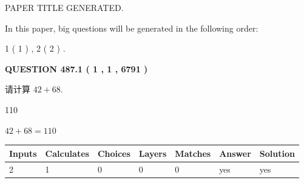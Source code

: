 \documentclass{ctexart}
\begin{document}
   
\vspace{0.2in}
   
   
   
   
   
   
   
   
 \vspace{0.2in}
 
 
 
 
   
   
 PAPER TITLE GENERATED.
   
   
   
\vspace{0.2in}
   
In this paper, big questions will be generated in the following order: 
   
   
   1 ( 1 )
 ,
   2 ( 2 )
 .
  
\vspace{0.2in}
  
{\textbf{\Large{QUESTION
487.1 
 ( 1 , 1 , 6791 )
}}}
  
  
 
请计算 $ %
42 +  %
68 $.
 
 
 
\noindent{}
 
 

110
 
 
\noindent{}
 
 

 
 
 
\noindent{}
 
 

$ %
42 +  %
68=   %
110$
 
 
\noindent{}
 
 

 
   
   
   
   
\noindent\begin{tabular}{|l|l|l|l|l|l|l|}
 \hline
Inputs & Calculates & Choices & Layers & Matches & Answer & Solution \\ \hline
 2  & 
 1  & 
 0
  & 
 0  & 
 0  & 
  yes & 
  yes 
  \\ \hline
 \end{tabular}
   
\end{document}
